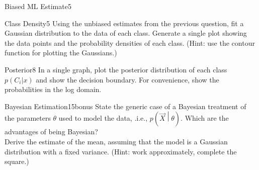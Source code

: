 \begin{questions}
\begin{question}{Biased ML Estimate}{5}
\begin{answer}

\end{answer}

\end{question}



\begin{question}{Class Density}{5}
Using the unbiased estimates from the previous question, fit a Gaussian distribution to the data of each class. Generate a single plot showing the data points and the probability densities of each class.
(Hint: use the contour function for plotting the Gaussians.) 

\begin{answer}

\end{answer}

\end{question}


\begin{question}{Posterior}{8}
In a single graph, plot the posterior distribution of each class $p(C_i|x)$ 
and show the decision boundary. For convenience, show the probabilities
in the log domain.

\begin{answer}

\end{answer}

\end{question}


\begin{question}{Bayesian Estimation}{15}{bonus}
State the generic case of a Bayesian treatment of the parameters $\theta$ used to model the data, .i.e., $p(\vec X \middle | \theta )$. 
Which are the advantages of being Bayesian? 
\\ Derive the estimate of the mean, assuming that the model is a Gaussian distribution with a fixed variance. (Hint: work approximately, complete the square.)


\begin{answer}
\end{answer}

\end{question}

\end{questions}
